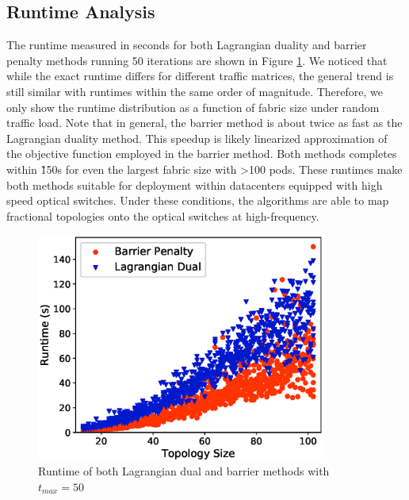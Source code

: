 \documentclass[sigconf]{acmart}
\theoremstyle{definition}
\begin{document}
\subsection{Runtime Analysis}
The runtime measured in seconds for both Lagrangian duality and barrier penalty methods running 50 iterations are shown in Figure \ref{runtime}. We noticed that while the exact runtime differs for different traffic matrices, the general trend is still similar with runtimes within the same order of magnitude. Therefore, we only show the runtime distribution as a function of fabric size under random traffic load. Note that in general, the barrier method is about twice as fast as the Lagrangian duality method. This speedup is likely linearized approximation of the objective function employed in the barrier method. Both methods completes within \~150s for even the largest fabric size with  >100 pods. These runtimes make both methods suitable for deployment within datacenters equipped with high speed optical switches. Under these conditions, the algorithms are able to map fractional topologies onto the optical switches at high-frequency. 
\begin{figure}[t]
    \centering
    \includegraphics[height=7.5cm, width=\linewidth,scale=0.90, trim={0.7cm 0.7cm 1.5cm 0.8cm}]{./figures/runtime.eps}
    \caption{Runtime of both Lagrangian dual and barrier methods with $t_{max} = 50$}
    \label{runtime}
\end{figure}
\end{document}
